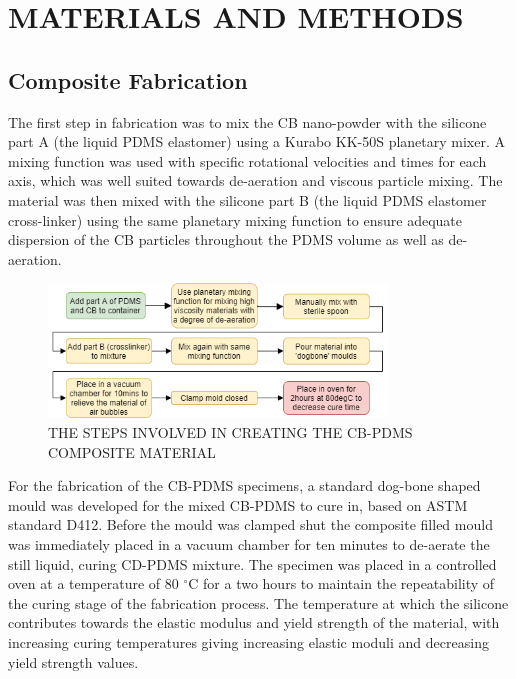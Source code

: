 \section*{MATERIALS AND METHODS}


\subsection*{Composite Fabrication}
The first step in fabrication was to mix the CB nano-powder with the silicone part A (the liquid PDMS elastomer) using a Kurabo KK-50S planetary mixer. A mixing function was used with specific rotational velocities and times for each axis, which was well suited towards de-aeration and viscous particle mixing. The material was then mixed with the silicone part B (the liquid PDMS elastomer cross-linker) using the same planetary mixing function to ensure adequate dispersion of the CB particles throughout the PDMS volume as well as de-aeration.
\begin{figure}[H]
	\centering
	\includegraphics[width=9cm]{Figures/specimenPrepFlowDiagram (1).png}
	\caption{THE STEPS INVOLVED IN CREATING THE CB-PDMS COMPOSITE MATERIAL}
	\label{fig:CB-PDMS_flow_diagram}
\end{figure}
For the fabrication of the CB-PDMS specimens, a standard dog-bone shaped mould was developed for the mixed CB-PDMS to cure in, based on ASTM standard D412\cite{ASTM2020}. Before the mould was clamped shut the composite filled mould was immediately placed in a vacuum chamber for ten minutes to de-aerate the still liquid, curing CD-PDMS mixture. The specimen was placed in a controlled oven at a temperature of 80 $^{\circ}$C for a two hours to maintain the repeatability of the curing stage of the fabrication process. The temperature at which the silicone contributes towards the elastic modulus and yield strength of the material, with increasing curing temperatures giving increasing elastic moduli and decreasing yield strength values.


